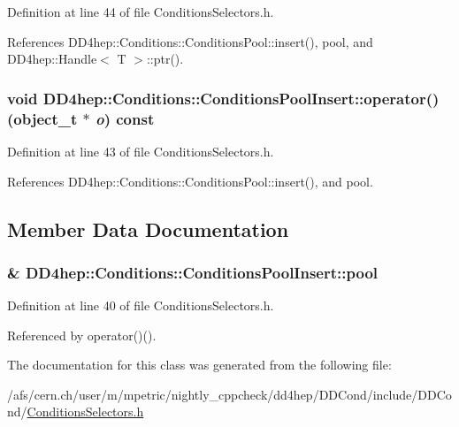 Definition at line 44 of file ConditionsSelectors.h.

References DD4hep::Conditions::ConditionsPool::insert(), pool, and DD4hep::Handle$<$ T $>$::ptr().\hypertarget{class_d_d4hep_1_1_conditions_1_1_conditions_pool_insert_a2a327243ab28fee758060e728cb96729}{
\subsubsection[{operator()}]{\setlength{\rightskip}{0pt plus 5cm}void DD4hep::Conditions::ConditionsPoolInsert::operator() ({\bf object\_\-t} $\ast$ {\em o}) const}}
\label{class_d_d4hep_1_1_conditions_1_1_conditions_pool_insert_a2a327243ab28fee758060e728cb96729}


Definition at line 43 of file ConditionsSelectors.h.

References DD4hep::Conditions::ConditionsPool::insert(), and pool.

\subsection{Member Data Documentation}
\hypertarget{class_d_d4hep_1_1_conditions_1_1_conditions_pool_insert_a3b76b291e4a502751367ea7bd0b357b6}{
\subsubsection[{pool}]{\& {\bf DD4hep::Conditions::ConditionsPoolInsert::pool}}}
\label{class_d_d4hep_1_1_conditions_1_1_conditions_pool_insert_a3b76b291e4a502751367ea7bd0b357b6}


Definition at line 40 of file ConditionsSelectors.h.

Referenced by operator()().

The documentation for this class was generated from the following file:\begin{DoxyCompactItemize}
\item 
/afs/cern.ch/user/m/mpetric/nightly\_\-cppcheck/dd4hep/DDCond/include/DDCond/\hyperlink{_conditions_selectors_8h}{ConditionsSelectors.h}\end{DoxyCompactItemize}
